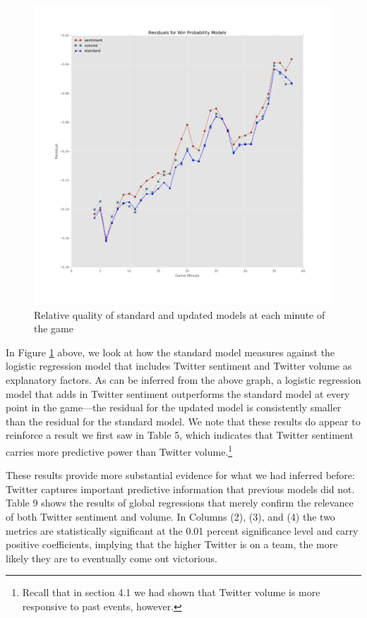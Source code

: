 \documentclass[12pt]{article}
\begin{document}
\begin{doublespacing}
\begin{figure} [H]
	\centering
	\includegraphics[scale = 0.4] {Images/VolumeSentResidualPlot.png} 
	\caption{Relative quality of standard and updated models at each minute of the game}\label{fig:modelcomparison}
\end{figure}

In Figure \ref{fig:modelcomparison} above, we look at how the standard model measures against the logistic regression model that includes Twitter sentiment and Twitter volume as explanatory factors. As can be inferred from the above graph, a logistic regression model that adds in Twitter sentiment outperforms the standard model at every point in the game---the residual for the updated model is consistently smaller than the residual for the standard model. We note that these results do appear to reinforce a result we first saw in Table 5, which indicates that Twitter sentiment carries more predictive power than Twitter volume.\footnote{Recall that in section 4.1 we had shown that Twitter volume is more responsive to past events, however.}

These results provide more substantial evidence for what we had inferred before: Twitter captures important predictive information that previous models did not. Table 9 shows the results of global regressions that merely confirm the relevance of both Twitter sentiment and volume. In Columns (2), (3), and (4) the two metrics are statistically significant at the 0.01 percent significance level and carry positive coefficients, implying that the higher Twitter is on a team, the more likely they are to eventually come out victorious. 


\end{doublespacing}
\end{document}
